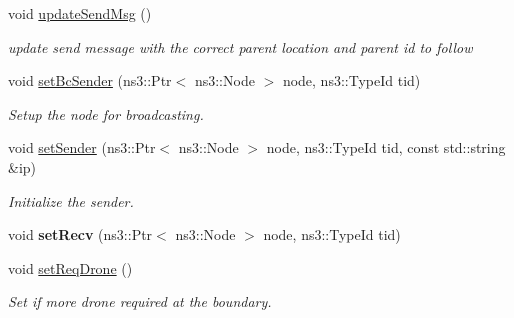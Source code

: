 \begin{DoxyCompactItemize}
\mbox{\label{structrnl_1_1DroneSoc_a552f5f4e560c562ac249ff8f255f48c9}} 
void \hyperlink{structrnl_1_1DroneSoc_a552f5f4e560c562ac249ff8f255f48c9}{update\+Send\+Msg} ()
\begin{DoxyCompactList}\small\item\em update send message with the correct parent location and parent id to follow \end{DoxyCompactList}\item 
void \hyperlink{structrnl_1_1DroneSoc_ace69ee9fbd96e334a32fb5d499c70588}{set\+Bc\+Sender} (ns3\+::\+Ptr$<$ ns3\+::\+Node $>$ node, ns3\+::\+Type\+Id tid)
\begin{DoxyCompactList}\small\item\em Setup the node for broadcasting. \end{DoxyCompactList}\item 
void \hyperlink{structrnl_1_1DroneSoc_a79565f4fa767a87e45e400e1ab0b03f8}{set\+Sender} (ns3\+::\+Ptr$<$ ns3\+::\+Node $>$ node, ns3\+::\+Type\+Id tid, const std\+::string \&ip)
\begin{DoxyCompactList}\small\item\em Initialize the sender. \end{DoxyCompactList}\item 
\mbox{\label{structrnl_1_1DroneSoc_a7d39b630d3ace733b06e89879edacbbc}} 
void {\bfseries set\+Recv} (ns3\+::\+Ptr$<$ ns3\+::\+Node $>$ node, ns3\+::\+Type\+Id tid)
\item 
\mbox{\label{structrnl_1_1DroneSoc_a7db06059f42f449bcf5b93aa299924dd}} 
void \hyperlink{structrnl_1_1DroneSoc_a7db06059f42f449bcf5b93aa299924dd}{set\+Req\+Drone} ()
\begin{DoxyCompactList}\small\item\em Set if more drone required at the boundary. \end{DoxyCompactList}\end{DoxyCompactItemize}
